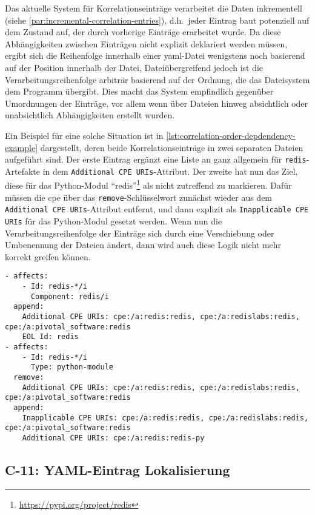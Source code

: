 Das aktuelle System für Korrelationseinträge verarbeitet die Daten inkrementell (siehe \autoref{par:incremental-correlation-entries}), d.h.\ jeder Eintrag baut potenziell auf dem Zustand auf, der durch vorherige Einträge erarbeitet wurde.
Da diese Abhängigkeiten zwischen Einträgen nicht explizit deklariert werden müssen, ergibt sich die Reihenfolge innerhalb einer \acrshort{yaml}-Datei wenigstens noch basierend auf der Position innerhalb der Datei, Dateiübergreifend jedoch ist die Verarbeitungsreihenfolge arbiträr basierend auf der Ordnung, die das Dateisystem dem Programm übergibt.
Dies macht das System empfindlich gegenüber Umordnungen der Einträge, vor allem wenn über Dateien hinweg absichtlich oder unabsichtlich Abhängigkeiten erstellt wurden.

Ein Beispiel für eine solche Situation ist in \autoref{lst:correlation-order-depdendency-example} dargestellt, deren beide Korrelationseinträge in zwei separaten Dateien aufgeführt sind.
Der erste Eintrag ergänzt eine Liste an  ganz allgemein für \texttt{redis}-Artefakte in dem \texttt{Additional CPE URIs}-Attribut.
Der zweite hat nun das Ziel, diese für das Python-Modul \enquote{redis}\footnote{\url{https://pypi.org/project/redis}} als nicht zutreffend zu markieren.
Dafür müssen die \acrshort{cpe} über das \texttt{remove}-Schlüsselwort zunächst wieder aus dem \texttt{Additional CPE URIs}-Attribut entfernt, und dann explizit als \texttt{Inapplicable CPE URIs} für das Python-Modul gesetzt werden.
Wenn nun die Verarbeitungsreihenfolge der Einträge sich durch eine Verschiebung oder Umbenennung der Dateien ändert, dann wird auch diese Logik nicht mehr korrekt greifen können.

\begin{lstlisting}[style=yaml,caption={Korrelationseinträge in zwei unterschiedlichen Dateien, die aufeinander aufbauen},label={lst:correlation-order-depdendency-example}]
- affects:
    - Id: redis-*/i
      Component: redis/i
  append:
    Additional CPE URIs: cpe:/a:redis:redis, cpe:/a:redislabs:redis, cpe:/a:pivotal_software:redis
    EOL Id: redis
- affects:
    - Id: redis-*/i
      Type: python-module
  remove:
    Additional CPE URIs: cpe:/a:redis:redis, cpe:/a:redislabs:redis, cpe:/a:pivotal_software:redis
  append:
    Inapplicable CPE URIs: cpe:/a:redis:redis, cpe:/a:redislabs:redis, cpe:/a:pivotal_software:redis
    Additional CPE URIs: cpe:/a:redis:redis-py
\end{lstlisting}

\subsection{C-11: YAML-Eintrag Lokalisierung}\label{subsec:c-11-finding-yaml-entries}

